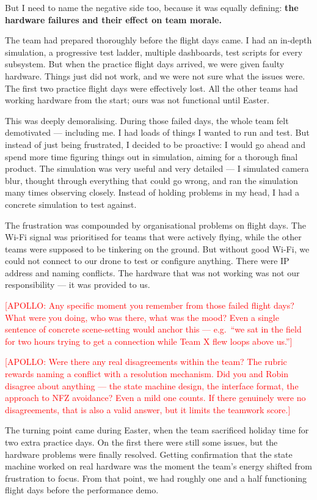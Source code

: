 But I need to name the negative side too, because it was equally defining: \textbf{the hardware failures and their effect on team morale.}

The team had prepared thoroughly before the flight days came. I had an in-depth simulation, a progressive test ladder, multiple dashboards, test scripts for every subsystem. But when the practice flight days arrived, we were given faulty hardware. Things just did not work, and we were not sure what the issues were. The first two practice flight days were effectively lost. All the other teams had working hardware from the start; ours was not functional until Easter.

This was deeply demoralising. During those failed days, the whole team felt demotivated --- including me. I had loads of things I wanted to run and test. But instead of just being frustrated, I decided to be proactive: I would go ahead and spend more time figuring things out in simulation, aiming for a thorough final product. The simulation was very useful and very detailed --- I simulated camera blur, thought through everything that could go wrong, and ran the simulation many times observing closely. Instead of holding problems in my head, I had a concrete simulation to test against.

The frustration was compounded by organisational problems on flight days. The Wi-Fi signal was prioritised for teams that were actively flying, while the other teams were supposed to be tinkering on the ground. But without good Wi-Fi, we could not connect to our drone to test or configure anything. There were IP address and naming conflicts. The hardware that was not working was not our responsibility --- it was provided to us.

\textcolor{red}{[APOLLO: Any specific moment you remember from those failed flight days? What were you doing, who was there, what was the mood? Even a single sentence of concrete scene-setting would anchor this --- e.g.\ ``we sat in the field for two hours trying to get a connection while Team X flew loops above us.'']}

\textcolor{red}{[APOLLO: Were there any real disagreements within the team? The rubric rewards naming a conflict with a resolution mechanism. Did you and Robin disagree about anything --- the state machine design, the interface format, the approach to NFZ avoidance? Even a mild one counts. If there genuinely were no disagreements, that is also a valid answer, but it limits the teamwork score.]}

The turning point came during Easter, when the team sacrificed holiday time for two extra practice days. On the first there were still some issues, but the hardware problems were finally resolved. Getting confirmation that the state machine worked on real hardware was the moment the team's energy shifted from frustration to focus. From that point, we had roughly one and a half functioning flight days before the performance demo.

